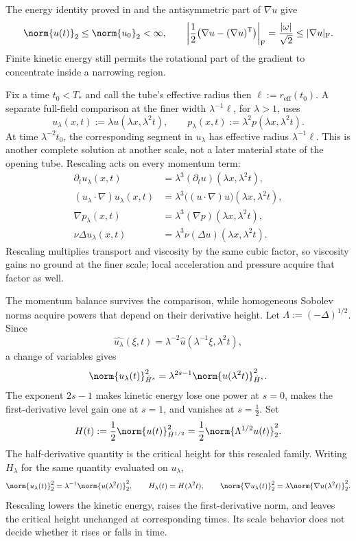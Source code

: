 The energy identity proved in  and the antisymmetric part of \(\nabla u\) give
\[
  \norm{u(t)}_2
  \leq
  \norm{u_0}_2
  <\infty,
  \qquad
  \left|\frac12\bigl(\nabla u-(\nabla u)^{\mathsf T}\bigr)\right|_{\mathrm F}
  =
  \frac{|\omega|}{\sqrt2}
  \leq
  |\nabla u|_{\mathrm F}.
\]
Finite kinetic energy still permits the rotational part of the gradient to concentrate inside a narrowing region.


Fix a time \(t_0<T_*\) and call the tube's effective radius then \(\ell:=r_{\mathrm{eff}}(t_0)\). A separate full-field comparison at the finer width \(\lambda^{-1}\ell\), for \(\lambda>1\), uses
\[
  u_\lambda(x,t)
  :=
  \lambda u(\lambda x,\lambda^2t),
  \qquad
  p_\lambda(x,t)
  :=
  \lambda^2p(\lambda x,\lambda^2t).
\]
At time \(\lambda^{-2}t_0\), the corresponding segment in \(u_\lambda\) has effective radius \(\lambda^{-1}\ell\). This is another complete solution at another scale, not a later material state of the opening tube. Rescaling acts on every momentum term:
\[
\begin{aligned}
  \partial_tu_\lambda(x,t)
  &=
  \lambda^3(\partial_tu)(\lambda x,\lambda^2t),
  \\
  (u_\lambda\cdot\nabla)u_\lambda(x,t)
  &=
  \lambda^3\bigl((u\cdot\nabla)u\bigr)(\lambda x,\lambda^2t),
  \\
  \nabla p_\lambda(x,t)
  &=
  \lambda^3(\nabla p)(\lambda x,\lambda^2t),
  \\
  \nu\Delta u_\lambda(x,t)
  &=
  \lambda^3\nu(\Delta u)(\lambda x,\lambda^2t).
\end{aligned}
\]
Rescaling multiplies transport and viscosity by the same cubic factor, so viscosity gains no ground at the finer scale; local acceleration and pressure acquire that factor as well.


The momentum balance survives the comparison, while homogeneous Sobolev norms acquire powers that depend on their derivative height. Let \(\Lambda:=(-\Delta)^{1/2}\). Since
\[
  \widehat{u_\lambda}(\xi,t)
  =
  \lambda^{-2}\widehat u(\lambda^{-1}\xi,\lambda^2t),
\]
a change of variables gives
\[
  \norm{u_\lambda(t)}_{\dot H^s}^2
  =
  \lambda^{2s-1}
  \norm{u(\lambda^2t)}_{\dot H^s}^2.
\]
The exponent \(2s-1\) makes kinetic energy lose one power at \(s=0\), makes the first-derivative level gain one at \(s=1\), and vanishes at \(s=\tfrac12\). Set
\[
  H(t)
  :=
  \frac12\norm{u(t)}_{\dot H^{1/2}}^2
  =
  \frac12\norm{\Lambda^{1/2}u(t)}_2^2.
\]
The half-derivative quantity is the critical height for this rescaled family. Writing \(H_\lambda\) for the same quantity evaluated on \(u_\lambda\),
\[
  \norm{u_\lambda(t)}_2^2
  =
  \lambda^{-1}\norm{u(\lambda^2t)}_2^2,
  \qquad
  H_\lambda(t)=H(\lambda^2t),
  \qquad
  \norm{\nabla u_\lambda(t)}_2^2
  =
  \lambda\norm{\nabla u(\lambda^2t)}_2^2.
\]
Rescaling lowers the kinetic energy, raises the first-derivative norm, and leaves the critical height unchanged at corresponding times. Its scale behavior does not decide whether it rises or falls in time.

